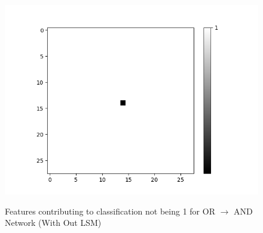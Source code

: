 \begin{figure}[H]
\begin{minipage}[t]{0.49\textwidth}
	\begin{minipage}[b]{0.49\textwidth}
		\captionsetup{labelformat=empty}
		\includegraphics[width=\textwidth]{OR-AND(WO-LSM)(1)/DontLike/False/Layer0-Neuron-28.png}
		\label{}
	\end{minipage}
	\caption{Features contributing to classification not being 1 for OR $\rightarrow$ AND Network (With Out LSM)}
	\label{fig:or-and-net-without-lsm-neg}
	\hfill
	\end{minipage}
\end{figure}

